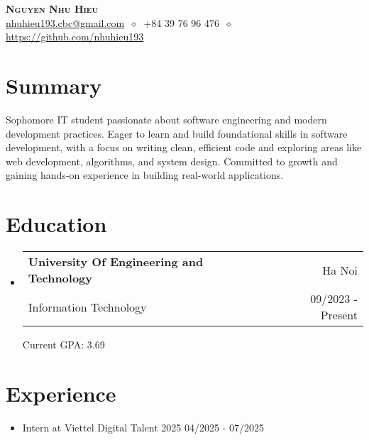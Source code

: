 \documentclass[letterpaper,11pt]{article}
\makeatletter
\newcommand{\cvitem}[1]{
  \item\small{
    {#1\vspace{-2pt}}
  }
}
\newcommand{\cvheading}[4]{
  \vspace{-2pt}\item
    \begin{tabular*}{\textwidth}[t]{l@{\extracolsep{\fill}}r}
      \textbf{#1} & #2 \\
      \small#3 & \small #4 \\
    \end{tabular*}\vspace{-7pt}
}
\newcommand{\cvheadingstart}{\begin{itemize}[leftmargin=0in, label={}]}
\newcommand{\cvheadingend}{\end{itemize}}
\newcommand{\cvitemstart}{\begin{itemize}\justifying}
\newcommand{\cvitemend}{\end{itemize}\vspace{-5pt}}
\makeatother
\begin{document}
\begin{center}
  \textbf{\LARGE\scshape Nguyen Nhu Hieu} \\
  \vspace{1pt}\small
  \href{mailto:}{nhuhieu193.cbc@gmail.com}
  $\ \diamond\ $ 
  +84 39 76 96 476
  $\ \diamond\ $
  \href{https://github.com/nhuhieu193}{https://github.com/nhuhieu193}
\end{center}




\section{Summary}
Sophomore IT student passionate about software engineering and modern development practices. Eager to learn and build foundational skills in software development, with a focus on writing clean, efficient code and exploring areas like web development, algorithms, and system design. Committed to growth and gaining hands-on experience in building real-world applications.

\section{Education}
\cvheadingstart
  \cvheading
    {University Of Engineering and Technology}{Ha Noi}
    {Information Technology}{09/2023 - Present}

    {Current GPA: 3.69}

\cvheadingend

\section{Experience}
\cvitemstart
    \item {Intern at Viettel Digital Talent 2025\hfill}
    {04/2025 - 07/2025}
\cvitemend
\end{document}
